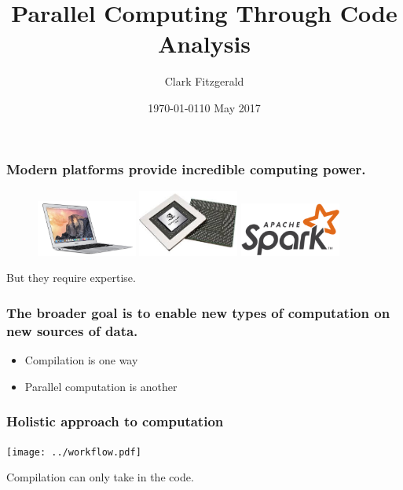 \documentclass{beamer}
\begin{document}
\title{Parallel Computing Through Code Analysis}
\date{\today}
\date{10 May 2017}
\author{Clark Fitzgerald}

\frame{\titlepage}


\begin{frame}

\frametitle{Modern platforms provide incredible computing power.}


% 

\begin{figure}
            \hfill
            \includegraphics[width=1.3in]{macbook.jpg}
            \hfill
            \includegraphics[width=1.3in]{gpu.jpg}
            \hfill
            \includegraphics[width=1.3in]{spark.png}
            \hfill
\end{figure}

\pause 

But they require expertise.

\end{frame}
\begin{frame}

    \frametitle{The broader goal is to enable new types of computation on
    new sources of data.}

    \begin{itemize}
        \item Compilation is one way
        \item Parallel computation is another
    \end{itemize}

\end{frame}
\begin{frame}

    \frametitle{Holistic approach to computation}

\centerline{\texttt{[image: ../workflow.pdf]}}

Compilation can only take in the code.

\end{frame}
\end{document}
